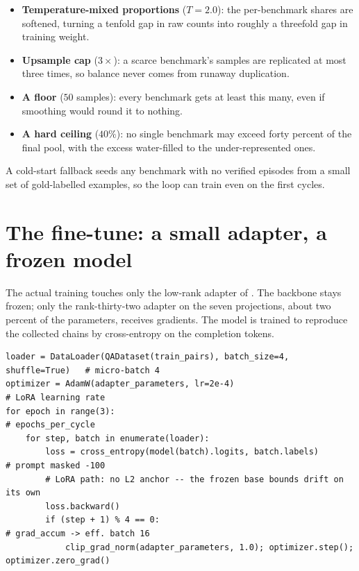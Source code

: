 \begin{bythenumbers}
\begin{itemize}[leftmargin=1.3em, itemsep=1pt]
  \item \textbf{Temperature-mixed proportions} ($T = 2.0$): the per-benchmark shares are
  softened, turning a tenfold gap in raw counts into roughly a threefold gap in training
  weight.
  \item \textbf{Upsample cap} ($3\times$): a scarce benchmark's samples are replicated at
  most three times, so balance never comes from runaway duplication.
  \item \textbf{A floor} ($50$ samples): every benchmark gets at least this many, even
  if smoothing would round it to nothing.
  \item \textbf{A hard ceiling} ($40\%$): no single benchmark may exceed forty percent of
  the final pool, with the excess water-filled to the under-represented ones.
\end{itemize}
A cold-start fallback seeds any benchmark with no verified episodes from a small set of
gold-labelled examples, so the loop can train even on the first cycles.
\end{bythenumbers}

\section{The fine-tune: a small adapter, a frozen model}
\label{sec:cycle-finetune}

The actual training touches only the low-rank adapter of . The
backbone stays frozen; only the rank-thirty-two adapter on the seven projections, about
two percent of the parameters, receives gradients. The model is trained to reproduce the
collected chains by cross-entropy on the completion tokens.

\begin{lstlisting}[caption={The fine-tune, condensed from \texttt{caem/training/self\_improvement.py}.}, label={lst:finetune}]
loader = DataLoader(QADataset(train_pairs), batch_size=4, shuffle=True)   # micro-batch 4
optimizer = AdamW(adapter_parameters, lr=2e-4)                            # LoRA learning rate
for epoch in range(3):                                                    # epochs_per_cycle
    for step, batch in enumerate(loader):
        loss = cross_entropy(model(batch).logits, batch.labels)           # prompt masked -100
        # LoRA path: no L2 anchor -- the frozen base bounds drift on its own
        loss.backward()
        if (step + 1) % 4 == 0:                                           # grad_accum -> eff. batch 16
            clip_grad_norm(adapter_parameters, 1.0); optimizer.step(); optimizer.zero_grad()
\end{lstlisting}

